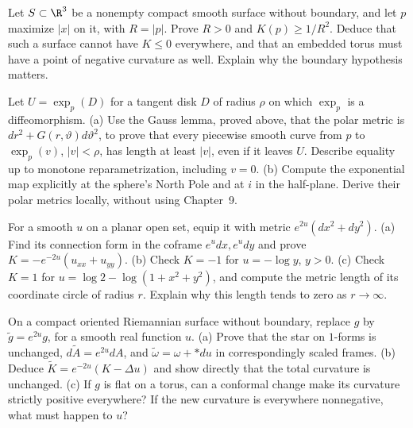 \begin{exercise}[$\star$]\label{ex:positivepoint}
Let $S\subset\R^3$ be a nonempty compact smooth surface without boundary, and let $p$ maximize $|x|$ on it, with $R=|p|$. Prove $R>0$ and $K(p)\ge1/R^2$. Deduce that such a surface cannot have $K\le0$ everywhere, and that an embedded torus must have a point of negative curvature as well. Explain why the boundary hypothesis matters.
\end{exercise}

\begin{exercise}[$\star\star$]\label{ex:geodlength}
Let $U=\exp_p(D)$ for a tangent disk $D$ of radius $\rho$ on which $\exp_p$ is a diffeomorphism.
(a) Use the Gauss lemma, proved above, that the polar metric is $dr^2+G(r,\vartheta)d\vartheta^2$, to prove that every piecewise smooth curve from $p$ to $\exp_p(v)$, $|v|<\rho$, has length at least $|v|$, even if it leaves $U$. Describe equality up to monotone reparametrization, including $v=0$.
(b) Compute the exponential map explicitly at the sphere's North Pole and at $i$ in the half-plane. Derive their polar metrics locally, without using Chapter~9.
\end{exercise}

\begin{exercise}[$\star\star$]\label{ex:v9-ch04-conformal-chart}
For a smooth $u$ on a planar open set, equip it with metric $e^{2u}(dx^2+dy^2)$.
(a) Find its connection form in the coframe $e^u dx,e^u dy$ and prove $K=-e^{-2u}(u_{xx}+u_{yy})$.
(b) Check $K=-1$ for $u=-\log y$, $y>0$.
(c) Check $K=1$ for $u=\log2-\log(1+x^2+y^2)$, and compute the metric length of its coordinate circle of radius $r$. Explain why this length tends to zero as $r\to\infty$.
\end{exercise}

\begin{exercise}[$\star\star$]\label{ex:v9-ch04-conformal-change}
On a compact oriented Riemannian surface without boundary, replace $g$ by $\tilde g=e^{2u}g$, for a smooth real function $u$.
(a) Prove that the star on $1$-forms is unchanged, $d\tilde A=e^{2u}dA$, and $\tilde\omega=\omega+\ast du$ in correspondingly scaled frames.
(b) Deduce $\tilde K=e^{-2u}(K-\Delta u)$ and show directly that the total curvature is unchanged.
(c) If $g$ is flat on a torus, can a conformal change make its curvature strictly positive everywhere? If the new curvature is everywhere nonnegative, what must happen to $u$?
\end{exercise}

